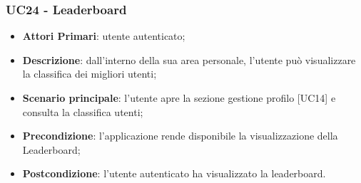 
\subsubsection{UC24 - Leaderboard}
\begin{itemize}
	\item \textbf{Attori Primari}: utente autenticato;
	\item \textbf{Descrizione}: dall'interno della sua area personale, l'utente può visualizzare la classifica dei migliori utenti;
	\item \textbf{Scenario principale}: l'utente apre la sezione gestione profilo [UC14] e consulta la classifica utenti;
	\item \textbf{Precondizione}: l'applicazione rende disponibile la visualizzazione della Leaderboard\glosp;
	\item \textbf{Postcondizione}: l'utente autenticato ha visualizzato la leaderboard.
\end{itemize}


